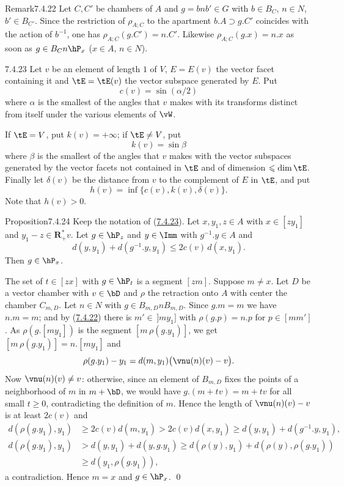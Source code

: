 \documentclass[12pt,a4paper,oneside,english]{smfart}
\makeatletter
\newcommand{\btanchor}[1]{\leavevmode\Hy@raisedlink{\hypertarget{bt:#1}{}}}
\newcommand{\btref}[1]{\hyperlink{bt:#1}{#1}}
\theoremstyle{definition}
\theoremstyle{bt}
\makeatother
\begin{document}
\begin{stmt}{Remark}{7.4.22}\btanchor{7.4.22}
Let $C,C'$ be chambers of $A$ and $g=bnb'\in G$ with $b\in B_C$, $n\in N$,
$b'\in B_{C'}$. Since the restriction of $\rho_{A;C}$ to the apartment
$b.A\supset g.C'$ coincides with the action of $b^{-1}$, one has
$\rho_{A;C}(g.C')=n.C'$. Likewise $\rho_{A;C}(g.x)=n.x$ as soon as
$g\in B_Cn\hP_x$ \textup{($x\in A$, $n\in N$)}.
\end{stmt}

\num{7.4.23}\btanchor{7.4.23} Let $v$ be an element of length $1$ of $V$, $E=E(v)$ the vector facet
containing it and $\tE=\tE(v)$ the vector subspace generated by $E$. Put
\[
  c(v)=\sin(\alpha/2)
\]
where $\alpha$ is the smallest of the angles that $v$ makes with its transforms
distinct from itself under the various elements of $\vW$.

If $\tE=V$, put $k(v)=+\infty$; if $\tE\neq V$, put
\[
  k(v)=\sin\beta
\]
where $\beta$ is the smallest of the angles that $v$ makes with the vector subspaces
generated by the vector facets not contained in $\tE$ and of dimension
$\leqslant\dim\tE$. Finally let $\delta(v)$ be the distance from $v$ to the
complement of $E$ in $\tE$, and put
\[
  h(v)=\inf\{c(v),k(v),\delta(v)\}.
\]
Note that $h(v)>0$.

\begin{stmt}{Proposition}{7.4.24}\btanchor{7.4.24}
Keep the notation of \textup{(\btref{7.4.23})}. Let $x,y_1,z\in A$ with $x\in[zy_1]$ and
$y_1-z\in\mathbf{R}^{*}_{+}v$. Let $g\in\hP_z$ and $y\in\Imm$ with $g^{-1}.y\in A$
and
\[
  d(y,y_1)+d(g^{-1}.y,y_1)\leqslant2c(v)\,d(x,y_1).
\]
Then $g\in\hP_x$.
\end{stmt}

\pf The set of $t\in[zx]$ with $g\in\hP_t$ is a segment $[zm]$. Suppose $m\neq x$.
Let $D$ be a vector chamber with $v\in\bD$ and $\rho$ the retraction onto $A$ with
center the chamber $C_{m,D}$. Let $n\in N$ with $g\in B_{m,D}nB_{m,D}$. Since
$g.m=m$ we have $n.m=m$; and by (\btref{7.4.22}) there is $m'\in\,]my_1]$ with
$\rho(g.p)=n.p$ for $p\in[mm']$. As $\rho(g.[my_1])$ is the segment
$[m\,\rho(g.y_1)]$, we get $[m\,\rho(g.y_1)]=n.[my_1]$ and
\[
  \rho(g.y_1)-y_1=d(m,y_1)\bigl(\vnu(n)(v)-v\bigr).
\]
Now $\vnu(n)(v)\neq v$: otherwise, since an element of $B_{m,D}$ fixes the points of
a neighborhood of $m$ in $m+\bD$, we would have $g.(m+tv)=m+tv$ for all small
$t\geqslant0$, contradicting the definition of $m$. Hence the length of
$\vnu(n)(v)-v$ is at least $2c(v)$ and
\begin{align*}
  d(\rho(g.y_1),y_1)&\geqslant2c(v)d(m,y_1)>2c(v)d(x,y_1)\geqslant d(y,y_1)+d(g^{-1}.y,y_1),\\
  d(\rho(g.y_1),y_1)&>d(y,y_1)+d(y,g.y_1)\geqslant d(\rho(y),y_1)+d(\rho(y),\rho(g.y_1))\\
  &\geqslant d(y_1,\rho(g.y_1)),
\end{align*}
a contradiction. Hence $m=x$ and $g\in\hP_x$. \qed
\end{document}
